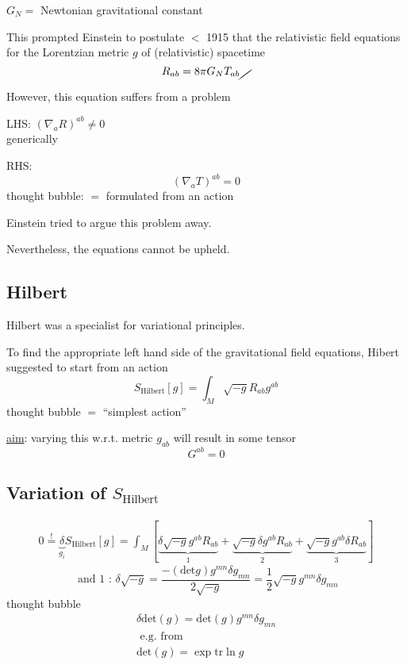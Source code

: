\documentclass[10pt, twoside]{amsart}
\begin{document}
\begin{multicols*}{2}
$G_N = $ Newtonian gravitational constant

This prompted Einstein to postulate $<$ 1915 that the relativistic field equations for the Lorentzian metric $g$ of (relativistic) spacetime
\[
R_{ab} = 8\pi G_N T_{ab} \cancel{ \quad }
\]

However, this equation suffers from a problem

LHS:
$(\nabla_a R)^{ab} \neq 0$ \\
generically

RHS:
\[
(\nabla_a T)^{ab}  = 0
\]
thought bubble: $=$ formulated from an action

Einstein tried to argue this problem away.  

Nevertheless, the equations cannot be upheld. 

\subsection{Hilbert}

Hilbert was a specialist for variational principles. 

To find the appropriate left hand side of the gravitational field equations, Hibert suggested to start from an action
\[
S_{\text{Hilbert}}[g] = \int_M \sqrt{-g} R_{ab}g^{ab}
\]
thought bubble $=$ ``simplest action''

\underline{aim}: varying this w.r.t. metric $g_{ab}$ will result in some tensor 
\[
G^{ab} = 0
\]

\subsection{Variation of $S_{\text{Hilbert}}$}

\[
\begin{gathered}
  0 \overset{!}{=} \underbrace{\delta}_{g_i} S_{\text{Hilbert}}[g] = \int_M [ \underbrace{ \delta \sqrt{-g} g^{ab}R_{ab} }_{1} + \underbrace{ \sqrt{-g} \delta g^{ab} R_{ab}}_{2} + \underbrace{ \sqrt{-g} g^{ab} \delta R_{ab} }_{3} ] 
\end{gathered}
\]
\[
\text{ and 1 : } \delta \sqrt{-g} = \frac{ - (\text{det}g)g^{mn} \delta g_{mn} }{ 2 \sqrt{-g}} = \frac{1}{2} \sqrt{-g} g^{mn} \delta g_{mn}
\]
thought bubble
\[
\begin{gathered}
  \delta \text{det}(g) = \text{det}(g) g^{mn} \delta g_{mn} \\ 
  \text{ e.g. from } \\
\text{det}(g) = \exp{ \text{tr}{ \ln{g} } }
\end{gathered}
\]


\end{multicols*}
\end{document}
